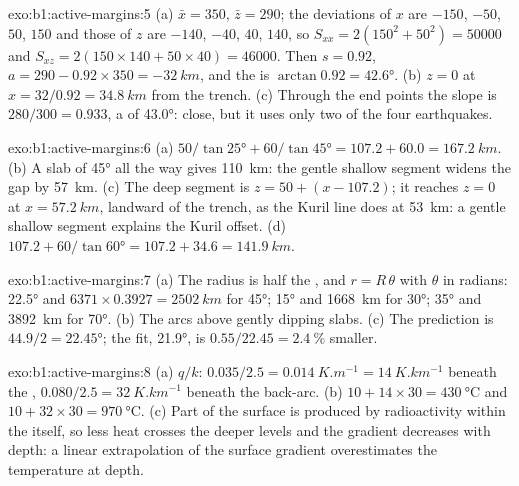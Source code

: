 \begin{solution}{exo:b1:active-margins:5}
(a) $\bar x = 350$, $\bar z = 290$; the deviations of $x$ are $-150$, $-50$,
$50$, $150$ and those of $z$ are $-140$, $-40$, $40$, $140$, so
$S_{xx} = 2(150^2 + 50^2) = \num{50000}$ and
$S_{xz} = 2(150\times140 + 50\times40) = \num{46000}$. Then $s = 0.92$,
$a = 290 - 0.92\times350 = \qty{-32}{km}$, and the  is
$\arctan 0.92 = \ang{42.6}$. (b) $z = 0$ at $x = 32/0.92 = \qty{34.8}{km}$
from the trench. (c) Through the end points the slope is $280/300 = 0.933$, a
 of \ang{43.0}: close, but it uses only two of the four earthquakes.
\end{solution}

\begin{solution}{exo:b1:active-margins:6}
(a) $50/\tan\ang{25} + 60/\tan\ang{45} = 107.2 + 60.0 = \qty{167.2}{km}$.
(b) A slab of \ang{45} all the way gives \qty{110}{km}: the gentle shallow
segment widens the gap by \qty{57}{km}. (c) The deep segment is
$z = 50 + (x - 107.2)$; it reaches $z = 0$ at $x = \qty{57.2}{km}$, landward of
the trench, as the Kuril line does at \qty{53}{km}: a gentle shallow segment
explains the Kuril offset. (d) $107.2 + 60/\tan\ang{60} = 107.2 + 34.6 =
\qty{141.9}{km}$.
\end{solution}

\begin{solution}{exo:b1:active-margins:7}
(a) The radius is half the , and $r = R\,\theta$ with $\theta$ in radians:
\ang{22.5} and $6371\times0.3927 = \qty{2502}{km}$ for \ang{45}; \ang{15} and
\qty{1668}{km} for \ang{30}; \ang{35} and \qty{3892}{km} for \ang{70}.
(b) The arcs above gently dipping slabs. (c) The prediction is
$44.9/2 = \ang{22.45}$; the fit, \ang{21.9}, is
$0.55/22.45 = \qty{2.4}{\percent}$ smaller.
\end{solution}

\begin{solution}{exo:b1:active-margins:8}
(a) $q/k$: $0.035/2.5 = \qty{0.014}{K.m^{-1}} = \qty{14}{K.km^{-1}}$ beneath
the , $0.080/2.5 = \qty{32}{K.km^{-1}}$ beneath the back-arc.
(b) $10 + 14\times30 = \qty{430}{\celsius}$ and
$10 + 32\times30 = \qty{970}{\celsius}$. (c) Part of the surface  is
produced by radioactivity within the  itself, so less heat crosses the
deeper levels and the gradient decreases with depth: a linear extrapolation of
the surface gradient overestimates the temperature at depth.
\end{solution}

